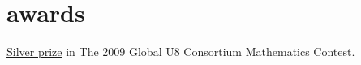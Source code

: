 \documentclass[]{friggeri-cv}
\begin{document}

\section{awards}

\href{http://www.tomgurion.me/pdfs/U8 mathematic contest - silver prize.pdf}{Silver prize} in The 2009 Global U8 Consortium Mathematics Contest.
\end{document}
